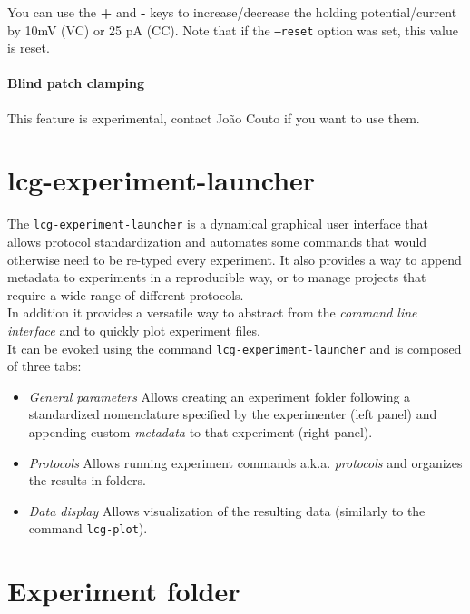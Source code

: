 You can use the \textbf{+} and \textbf{-} keys to increase/decrease the holding potential/current by 
10mV (VC) or 25 pA (CC). Note that if the \texttt{--reset} option was set, this value is reset.

\paragraph{Blind patch clamping} This feature is experimental, contact Jo\~ao Couto if you want to use them.


\section{lcg-experiment-launcher} \label{sec:exp_launcher}
The \texttt{lcg-experiment-launcher} is a dynamical graphical user interface that allows protocol standardization and automates some commands that would otherwise need to be re-typed every experiment. It also provides a way to append metadata to experiments in a reproducible way, or to manage projects that require a wide range of different protocols. \\
In addition it provides a versatile way to abstract from the \emph{command line interface} and to quickly plot experiment files. \\
It can be evoked using the command \texttt{lcg-experiment-launcher} and is composed of three tabs: 
\begin{itemize}
\item{\emph{General parameters}} Allows creating an experiment folder following a standardized nomenclature specified by the experimenter (left panel) and appending custom \emph{metadata} to that experiment (right panel).
	
\item{\emph{Protocols}} Allows running experiment commands a.k.a. \emph{protocols} and organizes the results in folders.

\item{\emph{Data display}} Allows visualization of the resulting data (similarly to the command \texttt{lcg-plot}).
\end{itemize}


\section{Experiment folder} \label{sec:exp_folder}

